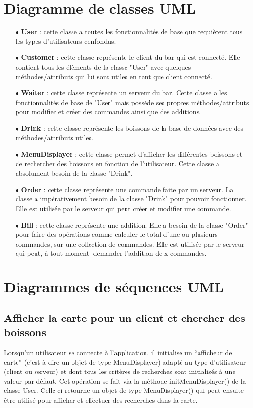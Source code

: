 


\section{Diagramme de classes UML}
\begin{itemize}
	\item[{$\bullet$}] \textbf{User} : cette classe a toutes les fonctionnalités de base que requièrent
	tous les types d'utilisateurs confondus.
	\item[{$\bullet$}] \textbf{Customer} : cette classe représente le client du bar qui est connecté.
	Elle contient tous les éléments de la classe "User" avec quelques méthodes/attributs qui lui sont utiles
	en tant que client connecté.
	\item[{$\bullet$}] \textbf{Waiter} : cette classe représente un serveur du bar. Cette classe a les
	fonctionnalités de base de "User" mais possède ses propres méthodes/attributs pour modifier et créer
	des commandes ainsi que des additions.
	\item[{$\bullet$}] \textbf{Drink} : cette classe représente les boissons de la base de données avec
	des méthodes/attributs utiles. 
	\item[{$\bullet$}] \textbf{MenuDisplayer} : cette classe permet d'afficher les
	différentes boissons et de rechercher des boissons en fonction de l'utilisateur. Cette classe a
	absolument besoin de la classe "Drink".
	\item[{$\bullet$}] \textbf{Order} : cette classe représente une commande faite par un serveur. La
	classe a impérativement besoin de la classe "Drink" pour pouvoir fonctionner. Elle est utilisée par
	le serveur qui peut créer et modifier une commande.
	\item[{$\bullet$}] \textbf{Bill} : cette classe représente une addition. Elle a besoin de
	la classe "Order" pour faire des opérations comme calculer le total d'une ou plusieurs
	commandes, sur une collection de commandes. Elle est utilisée par le serveur qui peut, à tout moment,
	demander l'addition de x commandes.
\end{itemize}
\section{Diagrammes de séquences UML}
\subsection{Afficher la carte pour un client et chercher des boissons}
Lorsqu'un utilisateur se connecte à l'application, il initialise un ``afficheur
de carte'' (c'est à dire un objet de type MenuDisplayer) adapté au type
d'utilisateur (client ou serveur) et dont tous les critères de recherches
sont initialisés à une valeur par défaut. Cet opération se fait via la méthode
initMenuDisplayer() de la classe User. Celle-ci retourne un objet de type
 MenuDisplayer() qui peut ensuite être utilisé pour afficher et effectuer
des recherches dans la carte.

